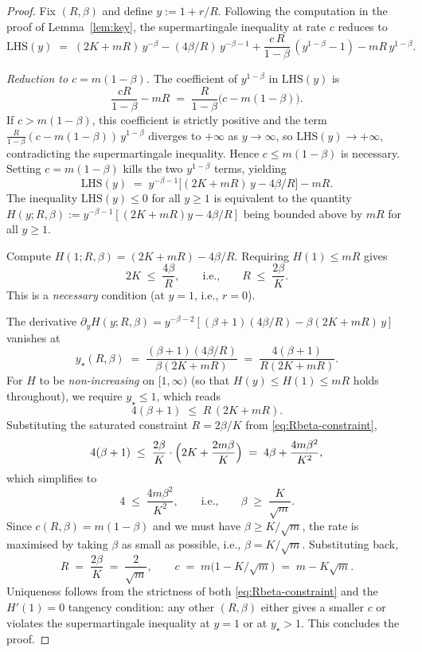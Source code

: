 \documentclass[11pt]{article}
\theoremstyle{definition}
\begin{document}
\begin{proof}
Fix $(R, \beta)$ and define $y := 1 + r/R$. Following the computation in the proof of Lemma~\ref{lem:key}, the supermartingale inequality at rate $c$ reduces to
\[
\text{LHS}(y) \;=\; (2K + m R)\,y^{-\beta} - (4\beta/R)\,y^{-\beta-1} + \frac{c\,R}{1-\beta}\,(y^{1-\beta} - 1) - m R\,y^{1-\beta}.
\]

\emph{Reduction to $c = m(1 - \beta)$.} The coefficient of $y^{1 - \beta}$ in $\mathrm{LHS}(y)$ is
\[
\frac{c R}{1 - \beta} - m R \;=\; \frac{R}{1 - \beta}\bigl(c - m(1 - \beta)\bigr).
\]
If $c > m(1 - \beta)$, this coefficient is strictly positive and the term $\tfrac{R}{1-\beta}(c - m(1-\beta))\,y^{1-\beta}$ diverges to $+\infty$ as $y \to \infty$, so $\mathrm{LHS}(y) \to +\infty$, contradicting the supermartingale inequality. Hence $c \le m(1 - \beta)$ is necessary. Setting $c = m(1 - \beta)$ kills the two $y^{1-\beta}$ terms, yielding
\[
\text{LHS}(y) \;=\; y^{-\beta-1}\bigl[(2K + m R)\,y - 4\beta/R\bigr] - m R.
\]
The inequality $\text{LHS}(y) \le 0$ for all $y \ge 1$ is equivalent to the quantity $H(y; R, \beta) := y^{-\beta-1}[(2K + mR)y - 4\beta/R]$ being bounded above by $mR$ for all $y \ge 1$.

Compute $H(1; R, \beta) = (2K + mR) - 4\beta/R$. Requiring $H(1) \le mR$ gives
\begin{equation}\label{eq:Rbeta-constraint}
2 K \;\le\; \frac{4\beta}{R}, \qquad\text{i.e.,}\qquad R \;\le\; \frac{2\beta}{K}.
\end{equation}
This is a \emph{necessary} condition (at $y = 1$, i.e., $r = 0$).

The derivative $\partial_y H(y; R, \beta) = y^{-\beta - 2}[(\beta + 1)(4\beta/R) - \beta (2K + mR)\,y]$ vanishes at
\[
y_\star(R, \beta) \;=\; \frac{(\beta+1)(4\beta/R)}{\beta(2K + mR)} \;=\; \frac{4(\beta+1)}{R(2K + mR)}.
\]
For $H$ to be \emph{non-increasing} on $[1, \infty)$ (so that $H(y) \le H(1) \le mR$ holds throughout), we require $y_\star \le 1$, which reads
\[
4(\beta + 1) \;\le\; R\,(2K + mR).
\]
Substituting the saturated constraint $R = 2\beta/K$ from \eqref{eq:Rbeta-constraint},
\[
4(\beta + 1) \;\le\; \frac{2\beta}{K}\cdot\Bigl(2K + \frac{2 m \beta}{K}\Bigr) \;=\; 4 \beta + \frac{4 m \beta^2}{K^2},
\]
which simplifies to
\[
4 \;\le\; \frac{4 m \beta^2}{K^2}, \qquad \text{i.e.,}\qquad \beta \;\ge\; \frac{K}{\sqrt m}.
\]
Since $c(R, \beta) = m(1 - \beta)$ and we must have $\beta \ge K/\sqrt m$, the rate is maximised by taking $\beta$ as small as possible, i.e., $\beta = K/\sqrt m$. Substituting back,
\[
R \;=\; \frac{2\beta}{K} \;=\; \frac{2}{\sqrt m}, \qquad c \;=\; m\bigl(1 - K/\sqrt m\bigr) \;=\; m - K\sqrt m.
\]
Uniqueness follows from the strictness of both \eqref{eq:Rbeta-constraint} and the $H'(1) = 0$ tangency condition: any other $(R, \beta)$ either gives a smaller $c$ or violates the supermartingale inequality at $y = 1$ or at $y_\star > 1$. This concludes the proof.
\end{proof}
\end{document}
